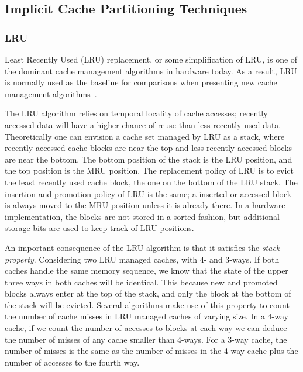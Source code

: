 



\subsection{Implicit Cache Partitioning Techniques}

\subsubsection{LRU}

Least Recently Used (LRU) replacement, or some simplification of LRU, is one of the dominant cache management algorithms in hardware today. 
As a result, LRU is normally used as the baseline for comparisons when presenting new cache management algorithms~\cite{Jaleel2010,Qureshi2006,Qureshi2007}.

The LRU algorithm relies on temporal locality of cache accesses; recently accessed data will have a higher chance of reuse than less recently used data.
Theoretically one can envision a cache set managed by LRU as a stack, where recently accessed cache blocks are near the top and less recently accessed blocks are near the bottom.
The bottom position of the stack is the LRU position, and the top position is the MRU position.
The replacement policy of LRU is to evict the least recently used cache block, the one on the bottom of the LRU stack.
The insertion and promotion policy of LRU is the same; a inserted or accessed block is always moved to the MRU position unless it is already there.
In a hardware implementation, the blocks are not stored in a sorted fashion, but additional storage bits are used to keep track of LRU positions.

An important consequence of the LRU algorithm is that it satisfies the \textit{stack property}.
Considering two LRU managed caches, with 4- and 3-ways.
If both caches handle the same memory sequence, we know that the state of the upper three ways in both caches will be identical.
This because new and promoted blocks always enter at the top of the stack, and only the block at the bottom of the stack will be evicted.
Several algorithms make use of this property to count the number of cache misses in LRU managed caches of varying size.
In a 4-way cache, if we count the number of accesses to blocks at each way we can deduce the number of misses of any cache smaller than 4-ways. 
For a 3-way cache, the number of misses is the same as the number of misses in the 4-way cache plus the number of accesses to the fourth way.

